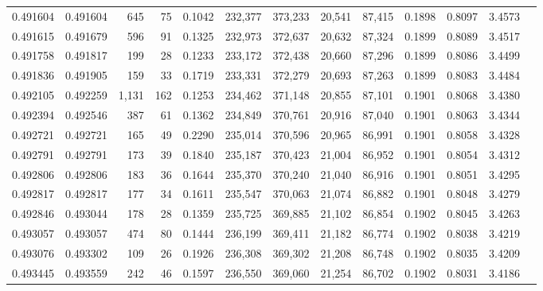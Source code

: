 \begin{tabular}{rrrrrrrrrrrrr}
0.491604 & 0.491604 &   645 &    75 &                                     0.1042 & 232,377 & 373,233 &  20,541 &  87,415 & 0.1898 & 0.8097 & 3.4573 \\
0.491615 & 0.491679 &   596 &    91 &                                     0.1325 & 232,973 & 372,637 &  20,632 &  87,324 & 0.1899 & 0.8089 & 3.4517 \\
0.491758 & 0.491817 &   199 &    28 &                                     0.1233 & 233,172 & 372,438 &  20,660 &  87,296 & 0.1899 & 0.8086 & 3.4499 \\
0.491836 & 0.491905 &   159 &    33 &                                     0.1719 & 233,331 & 372,279 &  20,693 &  87,263 & 0.1899 & 0.8083 & 3.4484 \\
0.492105 & 0.492259 & 1,131 &   162 &                                     0.1253 & 234,462 & 371,148 &  20,855 &  87,101 & 0.1901 & 0.8068 & 3.4380 \\
0.492394 & 0.492546 &   387 &    61 &                                     0.1362 & 234,849 & 370,761 &  20,916 &  87,040 & 0.1901 & 0.8063 & 3.4344 \\
0.492721 & 0.492721 &   165 &    49 &                                     0.2290 & 235,014 & 370,596 &  20,965 &  86,991 & 0.1901 & 0.8058 & 3.4328 \\
0.492791 & 0.492791 &   173 &    39 &                                     0.1840 & 235,187 & 370,423 &  21,004 &  86,952 & 0.1901 & 0.8054 & 3.4312 \\
0.492806 & 0.492806 &   183 &    36 &                                     0.1644 & 235,370 & 370,240 &  21,040 &  86,916 & 0.1901 & 0.8051 & 3.4295 \\
0.492817 & 0.492817 &   177 &    34 &                                     0.1611 & 235,547 & 370,063 &  21,074 &  86,882 & 0.1901 & 0.8048 & 3.4279 \\
0.492846 & 0.493044 &   178 &    28 &                                     0.1359 & 235,725 & 369,885 &  21,102 &  86,854 & 0.1902 & 0.8045 & 3.4263 \\
0.493057 & 0.493057 &   474 &    80 &                                     0.1444 & 236,199 & 369,411 &  21,182 &  86,774 & 0.1902 & 0.8038 & 3.4219 \\
0.493076 & 0.493302 &   109 &    26 &                                     0.1926 & 236,308 & 369,302 &  21,208 &  86,748 & 0.1902 & 0.8035 & 3.4209 \\
0.493445 & 0.493559 &   242 &    46 &                                     0.1597 & 236,550 & 369,060 &  21,254 &  86,702 & 0.1902 & 0.8031 & 3.4186 \\

\end{tabular}
